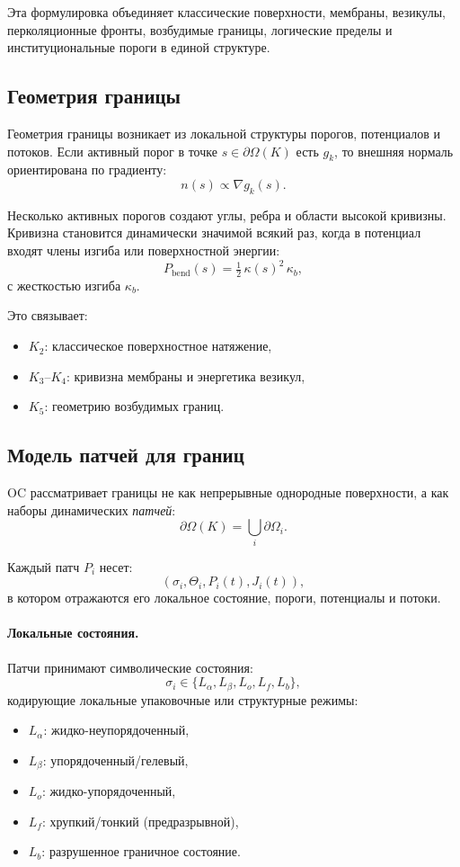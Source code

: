 Эта формулировка объединяет классические поверхности, мембраны, везикулы,
перколяционные фронты, возбудимые границы, логические пределы и институциональные
пороги в единой структуре.

\subsection{Геометрия границы}

Геометрия границы возникает из локальной структуры порогов, потенциалов и потоков.
Если активный порог в точке \(s \in \partial\Omega(K)\) есть \(g_k\), то внешняя
нормаль ориентирована по градиенту:
\[
  n(s) \propto \nabla g_k(s).
\]

Несколько активных порогов создают углы, ребра и области высокой кривизны.
Кривизна становится динамически значимой всякий раз, когда в потенциал входят
члены изгиба или поверхностной энергии:
\[
  P_{\mathrm{bend}}(s) = \tfrac{1}{2}\,\kappa(s)^2\,\kappa_b,
\]
с жесткостью изгиба \(\kappa_b\).

Это связывает:
\begin{itemize}
    \item \(K_2\): классическое поверхностное натяжение,
    \item \(K_3\)--\(K_4\): кривизна мембраны и энергетика везикул,
    \item \(K_5\): геометрию возбудимых границ.
\end{itemize}

\subsection{Модель патчей для границ}

OC рассматривает границы не как непрерывные однородные поверхности, а как
наборы динамических \emph{патчей}:
\[
  \partial\Omega(K) = \bigcup_i \partial\Omega_i.
\]

Каждый патч \(P_i\) несет:
\[
  (\sigma_i,\Theta_i,P_i(t),J_i(t)),
\]
в котором отражаются его локальное состояние, пороги, потенциалы и потоки.

\paragraph{Локальные состояния.}
Патчи принимают символические состояния:
\[
  \sigma_i \in \{L_\alpha, L_\beta, L_o, L_f, L_b\},
\]
кодирующие локальные упаковочные или структурные режимы:
\begin{itemize}
    \item \(L_\alpha\): жидко-неупорядоченный,
    \item \(L_\beta\): упорядоченный/гелевый,
    \item \(L_o\): жидко-упорядоченный,
    \item \(L_f\): хрупкий/тонкий (предразрывной),
    \item \(L_b\): разрушенное граничное состояние.
\end{itemize}

